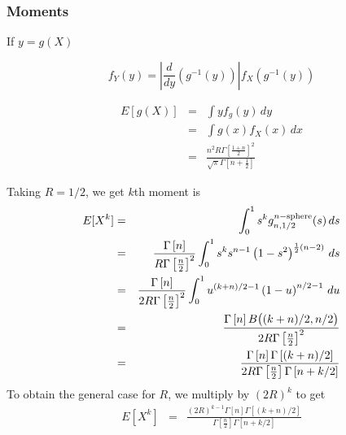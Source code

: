 \subsubsection{Moments}


If $y = g(X)$

\[ f_Y(y) = \left| \frac{d}{dy} \left( g^{-1}(y) \right) \right|
               f_X\left( g^{-1}(y) \right)
\]


\begin{eqnarray}
 E[ g(X) ] & = & \int y f_g (y) \, dy  \nonumber \\
           & = & \int g(x) f_X(x) \, dx  \nonumber \\
           & = &  \frac{n^{2}  R  {\Gamma\left[ \frac{1 + n}{2} \right]}^{2} }{ \sqrt{\pi} \Gamma\left[ n + \frac{1}{2} \right]  }            
\end{eqnarray}


Taking $R=1/2$, we get $k$th moment is
\begin{eqnarray}
E[ X^k ] 
    & = & \int_0^1 s^k g^{n-{\rm sphere}}_{n,1/2}(s) \, ds \nonumber \\
    & = & \frac{\Gamma\left[n\right]}{R \Gamma\left[\frac{n}{2}\right]^2} 
          \int_0^1 s^k s^{n-1}  \left(1 - s^2\right)^{\frac{1}{2} (n-2)}
               \, ds \nonumber \\
    & = & \frac{\Gamma\left[n\right]}{2 R \Gamma\left[\frac{n}{2}\right]^2} 
          \int_0^1 u^{(k+n)/2-1}  \left(1 - u \right)^{n/2-1}
               \, du \nonumber \\
    & = & \frac{\Gamma\left[n\right] B\big( (k+n)/2,n/2 \big)}
               {2 R \Gamma\left[\frac{n}{2}\right]^2}  \nonumber \\
    & = & \frac{\Gamma\left[ n \right] \Gamma\left[ (k+n)/2 \right]}
               {2 R \Gamma\left[\frac{n}{2}\right] \Gamma\left[ n+k/2 \right] } 
          \nonumber 
\end{eqnarray}
To obtain the general case for $R$, we multiply by $(2R)^k$ to get
\begin{eqnarray}
E[ X^k ] 
    & = & \frac{(2R)^{k-1} \Gamma\left[ n \right] \Gamma\left[ (k+n)/2 \right]}
               {\Gamma\left[\frac{n}{2}\right] \Gamma\left[ n+k/2 \right] } 
\end{eqnarray}
